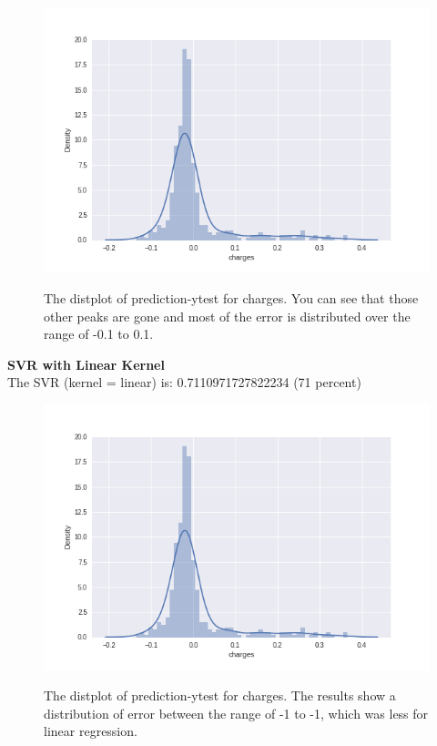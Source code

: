 \documentclass[12pt]{article}
\begin{document}
\begin{figure}[H]
\centering
\includegraphics[width=\textwidth]{linearR_withPoly.png}
\label{mesh:fig1}
\caption{The distplot of prediction-ytest for charges. You can see that those other peaks are gone and most of the error is distributed over the range of -0.1 to 0.1. }
\end{figure}
\pagebreak
\textbf{SVR with Linear Kernel}\\
The SVR (kernel = linear) is: 0.7110971727822234 (71 percent)
\begin{figure}[H]
\centering
\includegraphics[width=\textwidth]{linearR_withPoly.png}
\label{mesh:fig1}
\caption{The distplot of prediction-ytest for charges. The results show a distribution of error between the range of -1 to -1, which was less for linear regression.}
\end{figure}
\pagebreak
\end{document}
